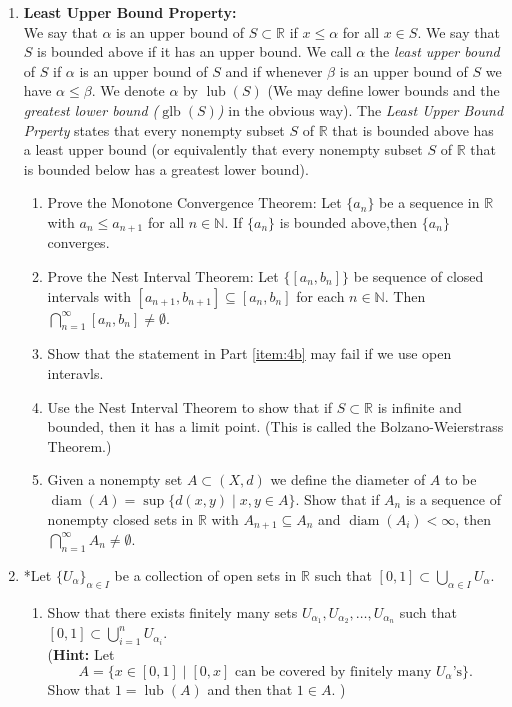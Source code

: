 \documentclass[notoc,notitlepage]{tufte-book}
\DeclareMathOperator{\lub}{lub }
\DeclareMathOperator{\glb}{glb }
\DeclareMathOperator{\diam}{diam }
\begin{document}
\begin{enumerate}
  \item \textbf{Least Upper Bound Property:} \\
    We say that $\alpha$ is an upper bound of $S \subset \mathbb{R}$ if $x \leq \alpha$ for all $x \in S$. We say that $S$ is bounded above if it has an upper bound. We call $\alpha$ the \textit{least upper bound} of $S$ if $\alpha$ is an upper bound of $S$ and if whenever $\beta$ is an upper bound of $S$ we have $\alpha \leq \beta$. We denote $\alpha$ by $\lub(S)$ (We may define lower bounds and the \textit{greatest lower bound ($\glb(S)$)} in the obvious way). The \textit{Least Upper Bound Prperty} states that every nonempty subset $S$ of $\mathbb{R}$ that is bounded above has a least upper bound (or equivalently that every nonempty subset $S$ of $\mathbb{R}$ that is bounded below has a greatest lower bound).
    \begin{enumerate}
      \item Prove the Monotone Convergence Theorem: Let $\{ a_n \}$ be a sequence in $\mathbb{R}$ with $a_n \leq a_{n + 1}$ for all $n \in \mathbb{N}$. If $\{ a_n \}$ is bounded above,then $\{ a_n \}$ converges.
      \item Prove the Nest Interval Theorem: Let $\{[a_n, b_n]\}$ be sequence of closed intervals with $[ a_{n + 1}, b_{n + 1} ] \subseteq [a_n, b_n]$ for each $n \in \mathbb{N}$. Then $\bigcap\limits_{n = 1}^{\infty} [ a_n, b_n ] \neq \emptyset$. \label{item:4b}
      \item Show that the statement in Part \ref{item:4b} may fail if we use open interavls.
      \item Use the Nest Interval Theorem to show that if $S \subset \mathbb{R}$ is infinite and bounded, then it has a limit point. (This is called the Bolzano-Weierstrass Theorem.)
      \item Given a nonempty set $A \subset (X, d)$ we define the diameter of $A$ to be $\diam(A) = \sup\{ d(x, y) \mid x, y \in A \}$. Show that if $A_n$ is a sequence of nonempty closed sets in $\mathbb{R}$ with $A_{n + 1} \subseteq A_n$ and $\diam(A_i) < \infty$, then $\bigcap\limits_{n = 1}^{\infty} A_n \neq \emptyset$.
    \end{enumerate}

  \item *Let $\{U_\alpha\}_{\alpha \in I}$ be a collection of open sets in $\mathbb{R}$ such that $[0, 1] \subset \bigcup_{\alpha \in I} U_\alpha$.
    \begin{enumerate}
      \item Show that there exists finitely many sets $U_{\alpha_1}, U_{\alpha_2} , \ldots, U_{\alpha_n}$ such that $[0, 1] \subset \bigcup\limits_{i = 1}^{n} U_{\alpha_i}$. \\
        (\textbf{Hint:} Let
        \begin{equation*}
          A = \{ x \in [0, 1] \mid [0, x] \text{ can be covered by finitely many } U_\alpha\text{'s} \}.
        \end{equation*}
        Show that $1 = \lub(A)$ and then that $1 \in A$. ) \label{item:5a}


\end{enumerate}
\end{enumerate}
\end{document}
